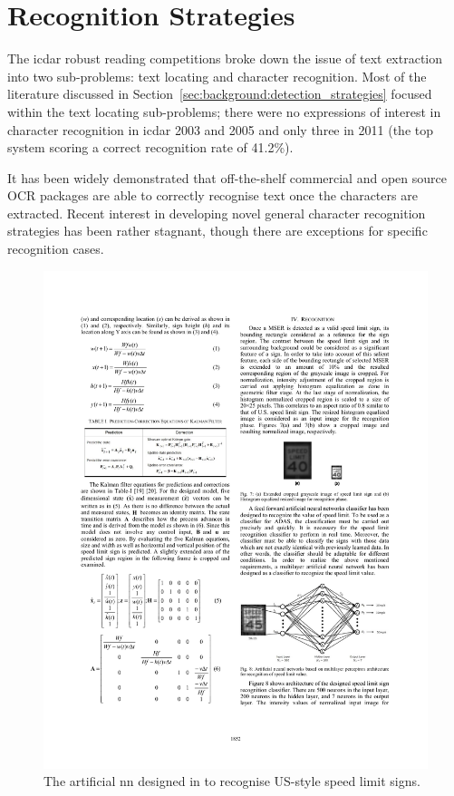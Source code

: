 \section{Recognition Strategies}
\label{sec:background:recognition_strategies}

The \gls{icdar} robust reading competitions \citep{Lucas:2003iw, Lucas:2005bq, Shahab:2011hq} broke down the issue of text extraction into two sub-problems: text locating and character recognition. Most of the literature discussed in Section~\ref{sec:background:detection_strategies} focused within the text locating sub-problems; there were no expressions of interest in character recognition in \gls{icdar} 2003 and 2005 and only three in 2011 (the top system \citep{Liu:2005uw} scoring a correct recognition rate of 41.2\%).

It has been widely demonstrated that off-the-shelf commercial and open source OCR packages  are able to correctly recognise text once the characters are extracted. Recent interest in developing novel general character recognition strategies has been rather stagnant, though there are exceptions for specific recognition cases.

\begin{figure}[h]
  \centering
  \includegraphics[width=\textwidth]{images/background/kundu2015_nn}
  \caption[A NN designed to recognised speed limit signs]{The artificial  \gls{nn} designed in \citet{Kundu:2015vq} to recognise US-style speed limit signs.}
  \label{fig:background:recognition:kundu2015_nn}
\end{figure}

